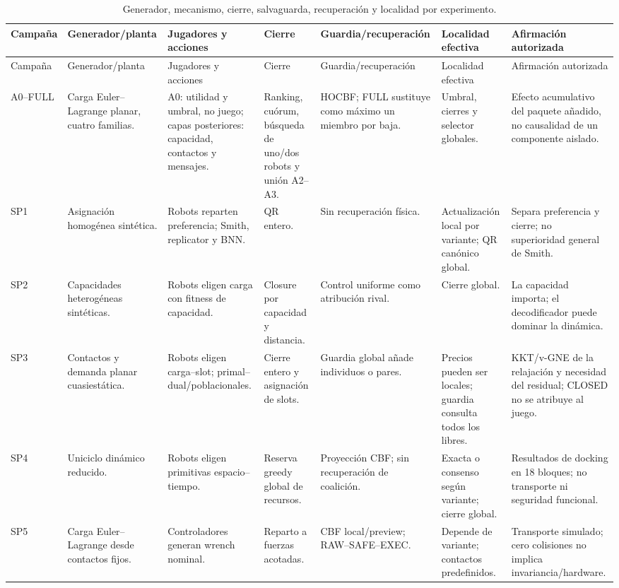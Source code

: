 \begin{landscape}
\scriptsize
\begin{longtable}{p{1.3cm}p{2.6cm}p{3.0cm}p{2.5cm}p{2.5cm}p{2.4cm}p{2.7cm}}
\caption{Generador, mecanismo, cierre, salvaguarda, recuperación y localidad por experimento.}\label{tab:mecanismo-por-experimento}\\
\toprule
Campaña & Generador/planta & Jugadores y acciones & Cierre & Guardia/recuperación & Localidad efectiva & Afirmación autorizada \\
\midrule
\endfirsthead
\toprule Campaña & Generador/planta & Jugadores y acciones & Cierre & Guardia/recuperación & Localidad efectiva & Afirmación autorizada \\
\midrule
\endhead
A0--FULL & Carga Euler--Lagrange planar, cuatro familias. & A0: utilidad y umbral, no juego; capas posteriores: capacidad, contactos y mensajes. & Ranking, cuórum, búsqueda de uno/dos robots y unión A2--A3. & HOCBF; FULL sustituye como máximo un miembro por baja. & Umbral, cierres y selector globales. & Efecto acumulativo del paquete añadido, no causalidad de un componente aislado. \\
SP1 & Asignación homogénea sintética. & Robots reparten preferencia; Smith, replicator y BNN. & QR entero. & Sin recuperación física. & Actualización local por variante; QR canónico global. & Separa preferencia y cierre; no superioridad general de Smith. \\
SP2 & Capacidades heterogéneas sintéticas. & Robots eligen carga con fitness de capacidad. & Closure por capacidad y distancia. & Control uniforme como atribución rival. & Cierre global. & La capacidad importa; el decodificador puede dominar la dinámica. \\
SP3 & Contactos y demanda planar cuasiestática. & Robots eligen carga--slot; primal--dual/poblacionales. & Cierre entero y asignación de slots. & Guardia global añade individuos o pares. & Precios pueden ser locales; guardia consulta todos los libres. & KKT/v-GNE de la relajación y necesidad del residual; CLOSED no se atribuye al juego. \\
SP4 & Uniciclo dinámico reducido. & Robots eligen primitivas espacio--tiempo. & Reserva greedy global de recursos. & Proyección CBF; sin recuperación de coalición. & Exacta o consenso según variante; cierre global. & Resultados de docking en 18 bloques; no transporte ni seguridad funcional. \\
SP5 & Carga Euler--Lagrange desde contactos fijos. & Controladores generan wrench nominal. & Reparto a fuerzas acotadas. & CBF local/preview; RAW--SAFE--EXEC. & Depende de variante; contactos predefinidos. & Transporte simulado; cero colisiones no implica invariancia/hardware. \\

\end{longtable}
\end{landscape}

